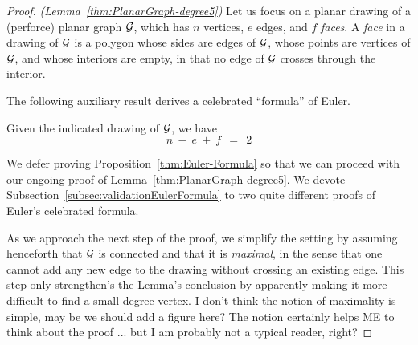 \begin{proof} {\em (Lemma~\ref{thm:PlanarGraph-degree5})}
Let us focus on a planar drawing of a (perforce) planar graph $\mbox{$\cal G$}$,
which has $n$ vertices, $e$ edges, and $f$ {\it faces}.  A {\it face}
in a drawing of $\mbox{$\cal G$}$ is a polygon whose sides are edges of
$\mbox{$\cal G$}$, whose points are vertices of $\mbox{$\cal G$}$, and whose interiors are empty,
in that no edge of $\mbox{$\cal G$}$ crosses through the interior.
\bigskip

\noindent {}
\bigskip

The following auxiliary result derives a celebrated ``formula'' of
Euler.   

\begin{prop} 
\label{thm:Euler-Formula}
Given the indicated drawing of $\mbox{$\cal G$}$, we have
\begin{equation}
\label{eqn:Eulers-formula}
n \ - \ e \ + \ f \ \ = \ \ 2
\end{equation}
\end{prop}

\medskip

We defer proving Proposition~\ref{thm:Euler-Formula} so that we can
proceed with our ongoing proof of Lemma~\ref{thm:PlanarGraph-degree5}.
We devote Subsection~\ref{subsec:validationEulerFormula} to two quite different proofs of Euler's
celebrated formula.

\medskip

As we approach the next step of the proof, we simplify the setting by
assuming henceforth that $\mbox{$\cal G$}$ is connected and that it is {\em maximal}, in the sense that one cannot
add any new edge to the drawing without crossing an existing edge.  This step only strengthen's the
Lemma's conclusion by apparently making it more difficult to find a small-degree vertex.
{\Denis I don't think the notion of maximality is simple, may be we should add a figure here?}
{\Arny The notion certainly helps ME to think about the proof ... but I am probably not
a typical reader, right?}


\end{proof}
